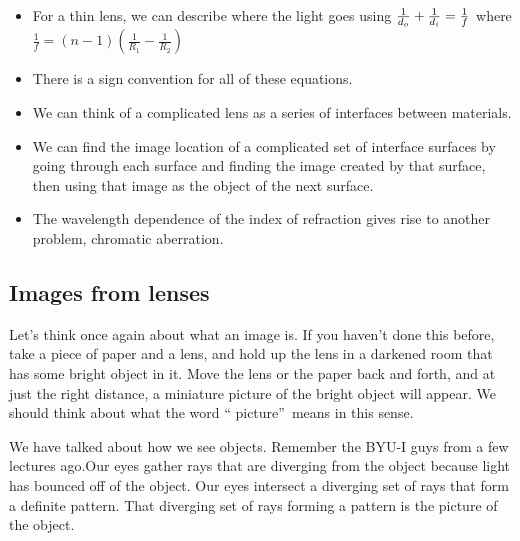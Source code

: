 \documentclass{article}
\begin{document}
\begin{itemize}
\item For a thin lens, we can describe where the light goes using $\frac{1}{%
d_{o}}+\frac{1}{d_{i}}=\frac{1}{f}$ where $\frac{1}{f}=\left( n-1\right)
\left( \frac{1}{R_{1}}-\frac{1}{R_{2}}\right) $

\item There is a sign convention for all of these equations.

\item We can think of a complicated lens as a series of interfaces between
materials.

\item We can find the image location of a complicated set of interface
surfaces by going through each surface and finding the image created by that
surface, then using that image as the object of the next surface.

\item The wavelength dependence of the index of refraction gives rise to
another problem, chromatic aberration.
\end{itemize}

\subsection{Images from lenses}

Let's think once again about what an image is. If you haven't done this
before, take a piece of paper and a lens, and hold up the lens in a darkened
room that has some bright object in it. Move the lens or the paper back and
forth, and at just the right distance, a miniature picture of the bright
object will appear. We should think about what the word \textquotedblleft
picture\textquotedblright\ means in this sense.

We have talked about how we see
objects. Remember the BYU-I guys from a few lectures ago.Our eyes gather rays that are
diverging from the object because light has bounced off of the object. Our
eyes intersect a diverging set of rays that form a definite pattern. That
diverging set of rays forming a pattern is the picture of the object.
\end{document}
